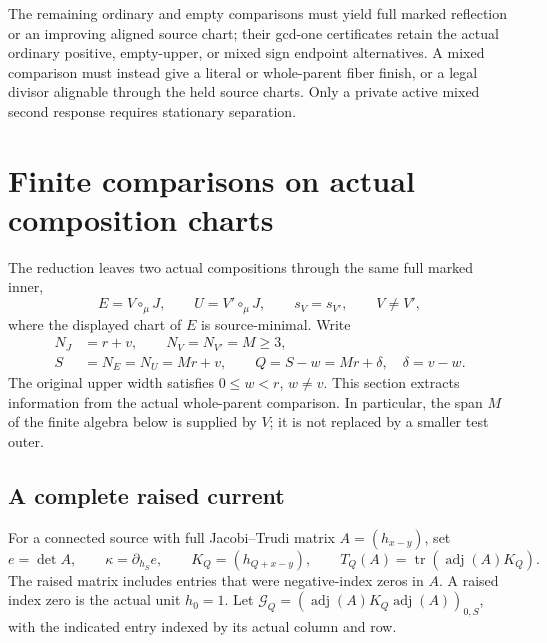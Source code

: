 \documentclass[11pt,a4paper]{amsart}
\numberwithin{equation}{section}
\theoremstyle{plain}
\theoremstyle{definition}
\begin{document}
The remaining ordinary and empty comparisons must yield full marked
reflection or an improving aligned source chart; their gcd-one
certificates retain the actual ordinary positive, empty-upper, or mixed
sign endpoint alternatives.  A mixed comparison must instead give a
literal or whole-parent fiber finish, or a legal divisor alignable
through the held source charts.  Only a private active mixed second
response requires stationary separation.

\section{Finite comparisons on actual composition charts}\label{sec:comparison}

The reduction leaves two actual compositions through the same full marked
inner,
\begin{equation}\label{ph:landing}
 E=V\circ_\mu J,\qquad U=V'\circ_\mu J,\qquad
 s_V=s_{V'},\qquad V\ne V',
\end{equation}
where the displayed chart of \(E\) is source-minimal.  Write
\[
 \begin{aligned}
 N_J&=r+v,\qquad N_V=N_{V'}=M\ge3,\\
 S&=N_E=N_U=Mr+v,\qquad Q=S-w=Mr+\delta,\quad \delta=v-w.
 \end{aligned}
\]
The original upper width satisfies \(0\le w<r\), \(w\ne v\).
This section extracts information from the actual whole-parent comparison.
In particular, the span \(M\) of the finite algebra below is supplied by
\(V\); it is not replaced by a smaller test outer.

\subsection{A complete raised current}
For a connected source with full Jacobi--Trudi matrix \(A=(h_{x-y})\), set
\[
 e=\det A,\qquad \kappa=\partial_{h_S}e,\qquad
 K_Q=(h_{Q+x-y}),\qquad T_Q(A)=\operatorname{tr}(\operatorname{adj}(A)K_Q).
\]
The raised matrix includes entries that were negative-index zeros in \(A\).
A raised index zero is the actual unit \(h_0=1\).
Let \(\mathcal G_Q=(\operatorname{adj}(A)K_Q\operatorname{adj}(A))_{0,S}\),
with the indicated entry indexed by its actual column and row.
\end{document}

